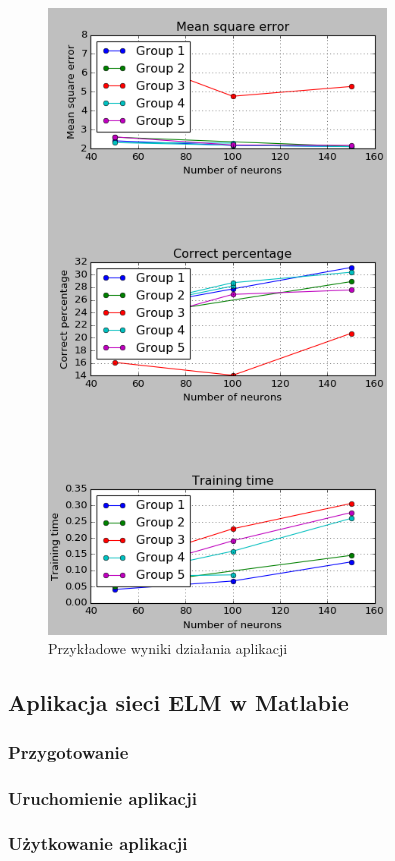 \documentclass{article}
\begin{document}
\begin{figure}[H]
\centering
\includegraphics[width=0.8\textwidth]{instrukcja_python_end.png}
\caption{Przykładowe wyniki działania aplikacji}
\end{figure}
\clearpage
\subsection*{Aplikacja sieci ELM w Matlabie}
\subsubsection*{Przygotowanie}
\subsubsection*{Uruchomienie aplikacji}
\subsubsection*{Użytkowanie aplikacji}
\end{document}
